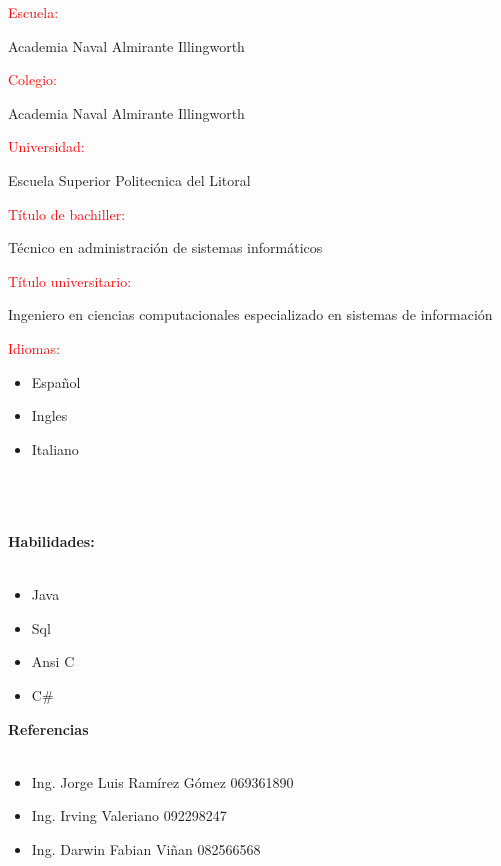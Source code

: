 \documentclass[20pt]{article}
\begin{document}
\begin{large}
\textcolor{red}{Escuela:}
\end{large}
Academia Naval Almirante Illingworth\\

\begin{large}
\textcolor{red}{Colegio:}
\end{large}
Academia Naval Almirante Illingworth\\

\begin{large}
\textcolor{red}{Universidad:}
\end{large}
Escuela Superior Politecnica del Litoral\\

\begin{large}
\textcolor{red}{Título de bachiller:}
\end{large}
Técnico en administración de sistemas informáticos\\

\begin{large}
\textcolor{red}{Título universitario:}
\end{large}
Ingeniero en ciencias computacionales especializado en sistemas de información\\

\begin{large}
\textcolor{red}{Idiomas:}
\end{large}
\begin{itemize}
\item Español
\item Ingles
\item Italiano\\\\\\\\
\end{itemize}

\begin{center}
\begin{huge}
\textbf{Habilidades:}\\\
\end{huge}
\end{center}
\begin{itemize}
\item Java
\item Sql
\item Ansi C
\item C\#\\
\end{itemize}


\begin{center}
\begin{huge}
\textbf{Referencias}\\\
\end{huge}
\end{center}

\begin{itemize}
\item Ing. Jorge Luis Ramírez Gómez 		069361890
\item Ing. Irving Valeriano			092298247
\item Ing. Darwin Fabian Viñan 		082566568
\end{itemize}
\end{document}
